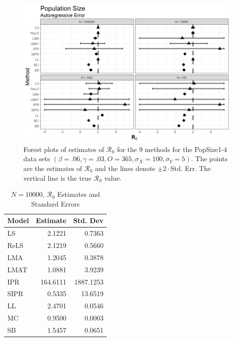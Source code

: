 \documentclass[12pt]{article}
\newcommand{\xxsir}{\ensuremath{9} } %
\newcommand{\rr}{\ensuremath{\mathcal{R}_0}}
\begin{document}
\begin{figure}[H]
	\centering
	\includegraphics[scale=0.5]{images/popsize_ar.jpeg}
	\caption{Forest plots of estimates of $\rr$ for the \xxsir methods for the PopSize1-4 data sets $(\beta=.06, \gamma=.03, O=365, \sigma_X=100, \sigma_Y=5)$.  The points are the estimates of $\rr$ and the lines denote $\pm 2\cdot $Std. Err.  The vertical line is the true $\rr$ value.}
\end{figure}

\begin{table}[H]
	
	\centering
	\begin{tabular}[t]{l|r|r}
		\hline
		Model & Estimate & Std. Dev\\
		\hline
		LS & 2.1221 & 0.7363\\
		\hline
		ReLS & 2.1219 & 0.5660\\
		\hline
		LMA & 1.2045 & 0.3878\\
		\hline
		LMAT & 1.0881 & 3.9239\\
		\hline
		IPR & 164.6111 & 1887.1253\\
		\hline
		SIPR & 0.5335 & 13.6519\\
		\hline
		LL & 2.4701 & 0.0546\\
		\hline
		MC & 0.9500 & 0.0003\\
		\hline
		SB & 1.5457 & 0.0651\\
		\hline
	\end{tabular}
	\caption{$N = 10000$, $\rr$ Estimates and Standard Errors}
\end{table}
\end{document}
